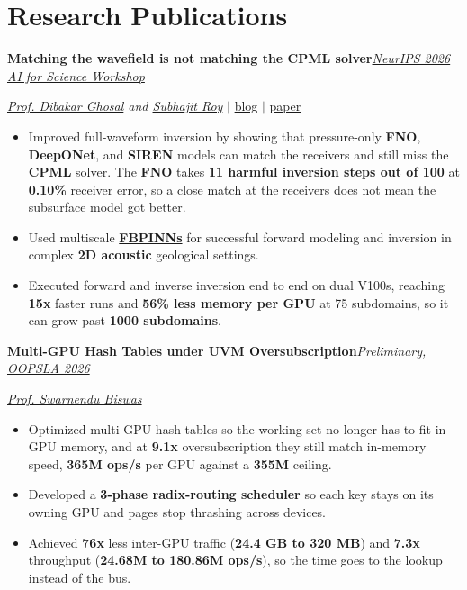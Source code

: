 \documentclass[a4paper,10pt]{article}
\newcommand{\jobheader}[2]{%
    \par\noindent\textbf{#1}\hfill #2\par
}
\newcommand{\jobgap}{\par\addvspace{8pt}}
\begin{document}
\section{Research Publications}
\jobheader{Matching the wavefield is not matching the CPML solver}{\textit{\href{https://ai4sciencecommunity.github.io/neurips26.html}{NeurIPS 2026 AI for Science Workshop}}}
\textit{\href{https://home.iitk.ac.in/~dghosal/Home.html}{Prof. Dibakar Ghosal} and \href{https://www.cse.iitk.ac.in/users/subhajit/}{Subhajit Roy}} $|$ \href{https://harsh-ps-2003.github.io/writes/2026-01-02-the-chronicles-of-training-fbpinns/}{blog} $|$ \href{https://harsh-ps-2003.github.io/about/neurIPS_ai4science.pdf}{paper}
\begin{itemize}
    \item[--] Improved full-waveform inversion by showing that pressure-only \textbf{FNO}, \textbf{DeepONet}, and \textbf{SIREN} models can match the receivers and still miss the \textbf{CPML} solver. The \textbf{FNO} takes \textbf{11 harmful inversion steps out of 100} at \textbf{0.10\%} receiver error, so a close match at the receivers does not mean the subsurface model got better.
    \item[--] Used multiscale \href{https://arxiv.org/pdf/2107.07871}{\textbf{FBPINNs}} for successful forward modeling and inversion in complex \textbf{2D acoustic} geological settings.
    \item[--] Executed forward and inverse inversion end to end on dual V100s, reaching \textbf{15x} faster runs and \textbf{56\% less memory per GPU} at 75 subdomains, so it can grow past \textbf{1000 subdomains}.
\end{itemize}

\jobgap
\jobheader{Multi-GPU Hash Tables under UVM Oversubscription}{\textit{Preliminary, \href{https://www.cse.iitk.ac.in/users/swarnendu/files/papers/gpu-ovs-ds-oopsla26.pdf}{OOPSLA 2026}}}
\textit{\href{https://www.cse.iitk.ac.in/users/swarnendu/}{Prof. Swarnendu Biswas}}
\begin{itemize}
    \item[--] Optimized multi-GPU hash tables so the working set no longer has to fit in GPU memory, and at \textbf{9.1x} oversubscription they still match in-memory speed, \textbf{365M ops/s} per GPU against a \textbf{355M} ceiling.
    \item[--] Developed a \textbf{3-phase radix-routing scheduler} so each key stays on its owning GPU and pages stop thrashing across devices.
    \item[--] Achieved \textbf{76x} less inter-GPU traffic (\textbf{24.4 GB to 320 MB}) and \textbf{7.3x} throughput (\textbf{24.68M to 180.86M ops/s}), so the time goes to the lookup instead of the bus.
\end{itemize}
\end{document}
